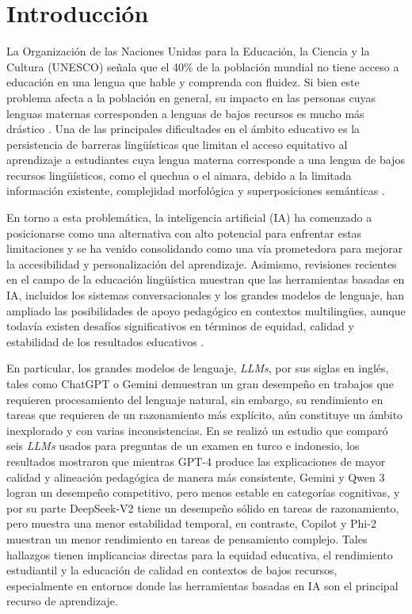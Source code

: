 \section{Introducción}
\vspace{-0.15cm}


La Organización de las Naciones Unidas para la Educación, la Ciencia y la Cultura (UNESCO) señala que el 40\% de la población mundial no tiene acceso a
educación en una lengua que hable y comprenda con fluidez. Si bien este problema afecta a la población en general, su impacto en las personas cuyas lenguas
maternas corresponden a lenguas de bajos recursos es mucho más drástico  \cite{UNESCO}. Una de las principales dificultades en el ámbito educativo es la persistencia de barreras lingüísticas que limitan el acceso equitativo al aprendizaje a estudiantes cuya lengua materna corresponde a una lengua de bajos recursos lingüísticos, como el quechua o el aimara, debido a la limitada información existente, complejidad morfológica y superposiciones semánticas \cite{Demilie2026,Tafa2025}. 


En torno a esta problemática, la inteligencia artificial (IA) ha comenzado a posicionarse como una alternativa con alto potencial para enfrentar estas limitaciones y se ha venido consolidando como una vía prometedora para mejorar la accesibilidad y personalización del aprendizaje. 
Asimismo, revisiones recientes en el campo de la educación lingüística muestran que las herramientas basadas en IA, incluidos los sistemas
conversacionales y los grandes modelos de lenguaje, han ampliado las posibilidades de apoyo pedagógico en contextos multilingües, aunque todavía existen desafíos significativos en términos de equidad, calidad y estabilidad de los resultados educativos \cite{BeldaMedina2022,Nwafor2026,Nouzri2025,Tebourbi2025}.


En particular, los grandes modelos de lenguaje, \textit{LLMs}, por sus siglas en inglés, tales como ChatGPT o Gemini demuestran un gran desempeño en trabajos que requieren procesamiento del lenguaje natural, sin embargo, su rendimiento en tareas que requieren de un razonamiento más explícito, aún constituye un ámbito inexplorado y con varias inconsistencias. En \cite{Onan2026} se realizó un estudio que comparó seis \textit{LLMs} usados para preguntas de un examen en turco e indonesio, los resultados mostraron que mientras GPT-4 produce las explicaciones de mayor calidad y alineación pedagógica de manera más consistente, Gemini y Qwen 3 logran un desempeño competitivo, pero menos estable en categorías cognitivas, y por su parte DeepSeek-V2 tiene un desempeño sólido en tareas de razonamiento, pero muestra una menor estabilidad temporal, en contraste, Copilot y Phi-2 muestran un menor rendimiento en tareas de pensamiento complejo. Tales hallazgos tienen implicancias directas para la equidad educativa, el rendimiento estudiantil y la educación de calidad en contextos de bajos recursos, especialmente en entornos donde las herramientas basadas en IA son el principal recurso de aprendizaje. 



